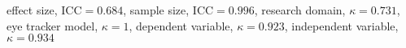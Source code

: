 effect size, $\textrm{ICC} = 0.684$, sample size, $\textrm{ICC} = 0.996$, research domain, $\kappa = 0.731$, eye tracker model, $\kappa = 1$, dependent variable, $\kappa = 0.923$, independent variable, $\kappa = 0.934$